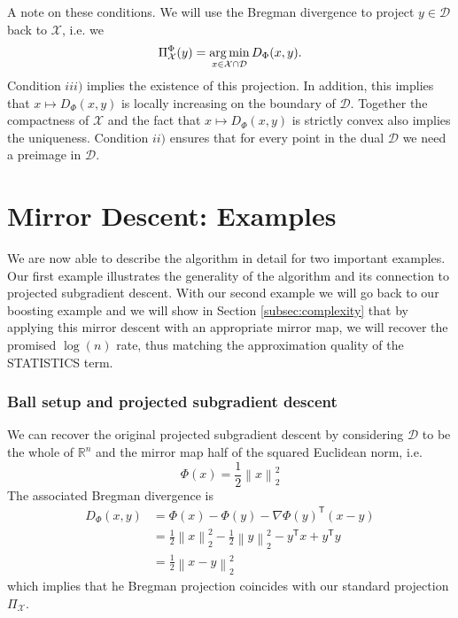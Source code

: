 A note on these conditions. We will use the Bregman divergence to project $y \in \mathcal{D}$ back to $\mathcal{X}$, i.e. we
\begin{equation*}
	\Pi_\mathcal{X}^\Phi(y) = \operatorname*{arg\,min}_{x\in \mathcal{X}\cap\mathcal{D}} D_\Phi(x, y).
\end{equation*}
Condition $iii)$ implies the existence of this projection. In addition, this implies that $x\mapsto D_\Phi(x, y)$ is locally increasing on the boundary of $\mathcal{D}$. Together the compactness of $\mathcal{X}$ and the fact that $x\mapsto D_\Phi(x, y)$ is strictly convex also implies the uniqueness.
Condition $ii)$ ensures that for every point in the dual $\mathcal{D}$ we need a preimage in $\mathcal{D}$.



\section{Mirror Descent: Examples}

We are now able to describe the algorithm in detail for two important examples. Our first example illustrates the generality of the algorithm and its connection to projected subgradient descent. With our second example we will go back to our boosting example and we will show in Section \ref{subsec:complexity} that by applying this mirror descent with an appropriate mirror map, we will recover the promised $\log(n)$ rate, thus matching the approximation quality of the STATISTICS term.

\subsubsection{Ball setup and projected subgradient descent}
We can recover the original projected subgradient descent by considering $\mathcal{D}$ to be the whole of $\mathbb{R}^n$ and the mirror map half of the squared Euclidean norm, i.e.
\begin{equation*}
	\Phi(x) = \frac{1}{2}\left\|x\right\|_2^2
\end{equation*}
The associated Bregman divergence is
\begin{align*}
	D_\Phi(x, y) &= \Phi(x) - \Phi(y) - \nabla \Phi(y)^\mathsf{T}(x - y) \\
	& = \frac{1}{2}\left\|x\right\|_2^2 - \frac{1}{2}\left\|y\right\|_2^2 - y^\mathsf{T}x + y^\mathsf{T}y \\
	& = \frac{1}{2}\left\|x - y\right\|_2^2
\end{align*}
which implies that he Bregman projection coincides with our standard projection $\Pi_\mathcal{X}$.

